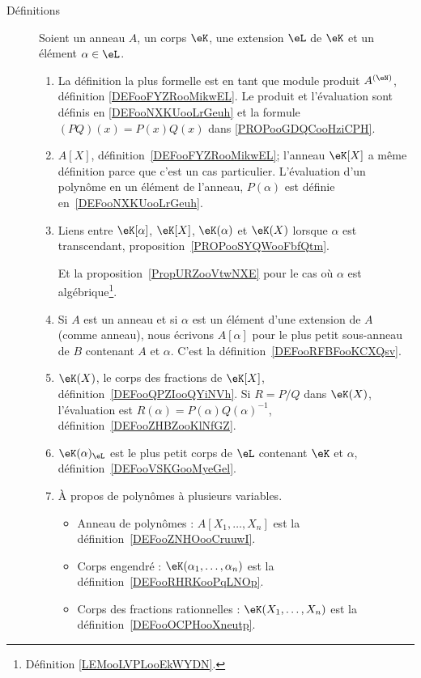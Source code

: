\begin{description}
    \item[Définitions]
        Soient un anneau \( A\), un corps \( \eK\), une extension \( \eL\) de \( \eK\) et un élément \( \alpha\in \eL\).
        \begin{enumerate}
            \item
                La définition la plus formelle est en tant que module produit \( A^{(\eN)}\), définition \ref{DEFooFYZRooMikwEL}. Le produit et l'évaluation sont définis en \ref{DEFooNXKUooLrGeuh} et la formule \( (PQ)(x)=P(x)Q(x)\) dans \ref{PROPooGDQCooHziCPH}.
            \item
                \( A[X]\), définition~\ref{DEFooFYZRooMikwEL}; l'anneau \( \eK[X]\) a même définition parce que c'est un cas particulier. L'évaluation d'un polynôme en un élément de l'anneau, \( P(\alpha)\) est définie en~\ref{DEFooNXKUooLrGeuh}.
            \item
                Liens entre \( \eK[\alpha]\), \( \eK[X]\), \( \eK(\alpha)\) et \( \eK(X)\) lorsque \( \alpha\) est transcendant, proposition~\ref{PROPooSYQWooFbfQtm}.

                Et la proposition~\ref{PropURZooVtwNXE} pour le cas où \( \alpha\) est algébrique\footnote{Définition \ref{LEMooLVPLooEkWYDN}.}.
            \item
                Si \( A\) est un anneau et si \( \alpha\) est un élément d'une extension de \( A\) (comme anneau), nous écrivons \( A[\alpha]\) pour le plus petit sous-anneau de \( B\) contenant \( A\) et \( \alpha\). C'est la définition~\ref{DEFooRFBFooKCXQsv}.
            \item
                \( \eK(X)\), le corps des fractions de \( \eK[X]\), définition~\ref{DEFooQPZIooQYiNVh}. Si \( R=P/Q\) dans \( \eK(X)\), l'évaluation est \( R(\alpha)=P(\alpha)Q(\alpha)^{-1}\), définition~\ref{DEFooZHBZooKlNfGZ}.
            \item
                \( \eK(\alpha)_{\eL}\) est le plus petit corps de \( \eL\) contenant \( \eK\) et \( \alpha\), définition~\ref{DEFooVSKGooMyeGel}.
            \item
                À propos de polynômes à plusieurs variables.
                \begin{itemize}
                    \item Anneau de polynômes : \( A[X_1,\ldots, X_n]\) est la définition~\ref{DEFooZNHOooCruuwI}. 
                    \item Corps engendré : \( \eK(\alpha_1,\ldots, \alpha_n)\) est la définition~\ref{DEFooRHRKooPqLNOp}. 
                    \item Corps des fractions rationnelles : \( \eK(X_1,\ldots, X_n)\) est la définition~\ref{DEFooOCPHooXneutp}.
                \end{itemize}
        \end{enumerate}


\end{description}
